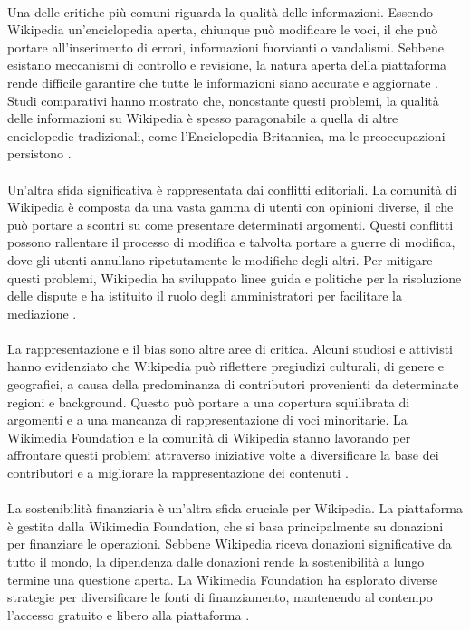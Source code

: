 \documentclass[12pt,a4paper]{report}
\begin{document}
\paragraph*{}
Una delle critiche più comuni riguarda la qualità delle informazioni. Essendo Wikipedia un'enciclopedia aperta, chiunque può modificare le voci, il che può portare all'inserimento di errori, informazioni fuorvianti o vandalismi. Sebbene esistano meccanismi di controllo e revisione, la natura aperta della piattaforma rende difficile garantire che tutte le informazioni siano accurate e aggiornate \cite{denning2005wikipedia}. Studi comparativi hanno mostrato che, nonostante questi problemi, la qualità delle informazioni su Wikipedia è spesso paragonabile a quella di altre enciclopedie tradizionali, come l'Enciclopedia Britannica, ma le preoccupazioni persistono \cite{giles2005nature}.

\paragraph*{}
Un'altra sfida significativa è rappresentata dai conflitti editoriali. La comunità di Wikipedia è composta da una vasta gamma di utenti con opinioni diverse, il che può portare a scontri su come presentare determinati argomenti. Questi conflitti possono rallentare il processo di modifica e talvolta portare a guerre di modifica, dove gli utenti annullano ripetutamente le modifiche degli altri. Per mitigare questi problemi, Wikipedia ha sviluppato linee guida e politiche per la risoluzione delle dispute e ha istituito il ruolo degli amministratori per facilitare la mediazione \cite{reagle2010good}.

\paragraph*{}
La rappresentazione e il bias sono altre aree di critica. Alcuni studiosi e attivisti hanno evidenziato che Wikipedia può riflettere pregiudizi culturali, di genere e geografici, a causa della predominanza di contributori provenienti da determinate regioni e background. Questo può portare a una copertura squilibrata di argomenti e a una mancanza di rappresentazione di voci minoritarie. La Wikimedia Foundation e la comunità di Wikipedia stanno lavorando per affrontare questi problemi attraverso iniziative volte a diversificare la base dei contributori e a migliorare la rappresentazione dei contenuti \cite{jemielniak2014wikipedia}.

\paragraph*{}
La sostenibilità finanziaria è un'altra sfida cruciale per Wikipedia. La piattaforma è gestita dalla Wikimedia Foundation, che si basa principalmente su donazioni per finanziare le operazioni. Sebbene Wikipedia riceva donazioni significative da tutto il mondo, la dipendenza dalle donazioni rende la sostenibilità a lungo termine una questione aperta. La Wikimedia Foundation ha esplorato diverse strategie per diversificare le fonti di finanziamento, mantenendo al contempo l'accesso gratuito e libero alla piattaforma \cite{history_of_wikis}.
\end{document}
